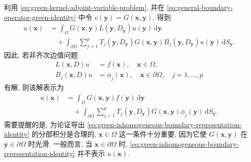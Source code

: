 利用 \eqref{eq:green-kernel-adjoint-variable-problem}, 并在 \eqref{eq:general-boundary-operator-green-identity} 中令 $v(\bm{y})=G(\bm{x},\bm{y})$, 得到
\begin{equation}\label{eq:green-inhomogeneous-boundary-representation-identity}
\begin{aligned}
u(\bm{x})&=\int_\Omega G(\bm{x},\bm{y})L(\bm{y},D_{\bm{y}})u(\bm{y})\,\mathrm{d}\bm{y}\\
&\quad+\int_{\partial\Omega}\sum_{j=1}^p T_j(\bm{y},D_{\bm{y}})G(\bm{x},\bm{y})B_j(\bm{y},D_{\bm{y}})u(\bm{y})\,\mathrm{d}S_{\bm{y}}.
\end{aligned}
\end{equation}
因此, 若非齐次边值问题
\begin{equation}\label{eq:general-inhomogeneous-boundary-value-problem}
\begin{aligned}
L(\bm{x},D)u&=f(\bm{x}),\quad\bm{x}\in\Omega,\\
B_j(\bm{x},D)u&=\phi_j(\bm{x}),\quad\bm{x}\in\partial\Omega,\quad j=1,\ldots,p
\end{aligned}
\end{equation}
有解, 则该解表示为
\begin{equation}\label{eq:green-general-inhomogeneous-solution-formula}
\begin{aligned}
u(\bm{x})&=\int_\Omega G(\bm{x},\bm{y})f(\bm{y})\,\mathrm{d}\bm{y}\\
&\quad+\int_{\partial\Omega}\sum_{j=1}^p T_j(\bm{y},D_{\bm{y}})G(\bm{x},\bm{y})\phi_j(\bm{y})\,\mathrm{d}S_{\bm{y}}.
\end{aligned}
\end{equation}
需要提醒的是, 为论证导出 \eqref{eq:green-inhomogeneous-boundary-representation-identity} 的分部积分是合理的, $\bm{x}\in\Omega$ 这一条件十分重要, 因为它使 $G(\bm{x},\bm{y})$ 在 $\bm{y}\in\partial\Omega$ 时光滑. 一般而言, 当 $\bm{x}\in\partial\Omega$ 时, \eqref{eq:green-inhomogeneous-boundary-representation-identity} 并不表示 $u(\bm{x})$.

